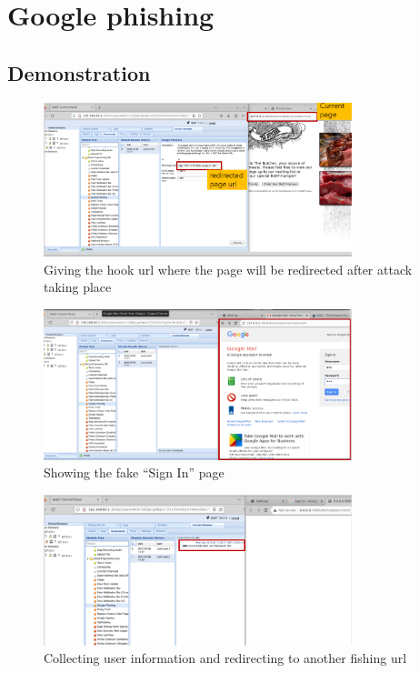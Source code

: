 \documentclass{report}
\begin{document}
\section{Google phishing}
\subsection{Demonstration}
\begin{figure}[!htbp]
    \centering
    \includegraphics[width=0.8\textwidth]{google Fishing/1.png}
    \caption{Giving the hook url where the page will be redirected after  attack taking place}
    \label{fig:gp1}
\end{figure}

\begin{figure}[!htbp]
    \centering
    \includegraphics[width=0.8\textwidth]{google Fishing/2.png}
    \caption{Showing the fake “Sign In” page}
    \label{fig:gp2}
\end{figure}


\begin{figure}[!htbp]
    \centering
    \includegraphics[width=0.8\textwidth]{google Fishing/3.png}
    \caption{Collecting user information and redirecting to another fishing url}
    \label{fig:gp3}
\end{figure}
\end{document}
